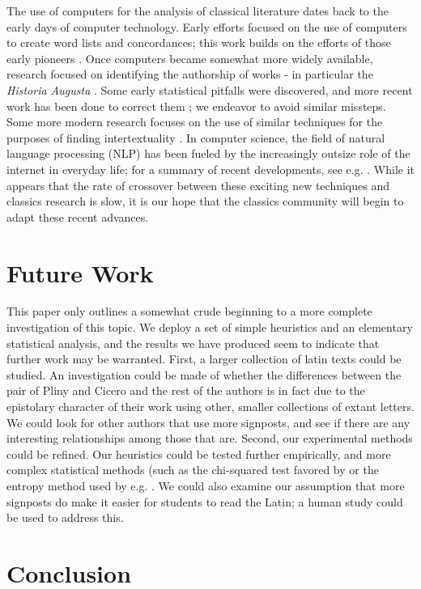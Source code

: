The use of computers for the analysis of classical literature dates back to the early days of computer technology. Early efforts focused on the use of computers to create word lists and concordances; this work builds on the efforts of those early pioneers \cite{early}. Once computers became somewhat more widely available, research focused on identifying the authorship of works - in particular the \textit{Historia Augusta} \cite{marriott}. Some early statistical pitfalls were discovered, and more recent work has been done to correct them \cite{sansone} \cite{purple}; we endeavor to avoid similar missteps. Some more modern research focuses on the use of similar techniques for the purposes of finding intertextuality \cite{forstall}. In computer science, the field of natural language processing (NLP) has been fueled by the increasingly outsize role of the internet in everyday life; for a summary of recent developments, see e.g. \cite{nlp}. While it appears that the rate of crossover between these exciting new techniques and classics research is slow, it is our hope that the classics community will begin to adapt these recent advances.

\section{Future Work}
\label{sec:Future}

This paper only outlines a somewhat crude beginning to a more complete investigation of this topic. We deploy a set of simple heuristics and an elementary statistical analysis, and the results we have produced seem to indicate that further work may be warranted. First, a larger collection of latin texts could be studied. An investigation could be made of whether the differences between the pair of Pliny and Cicero and the rest of the authors is in fact due to the epistolary character of their work using other, smaller collections of extant letters. We could look for other authors that use more signposts, and see if there are any interesting relationships among those that are. Second, our experimental methods could be refined. Our heuristics could be tested further empirically, and more complex statistical methods (such as the chi-squared test favored by \cite{chi2} or the entropy method used by e.g. \cite{software}. We could also examine our assumption that more signposts do make it easier for students to read the Latin; a human study could be used to address this.

\section{Conclusion}
\label{sec:conclusion}


